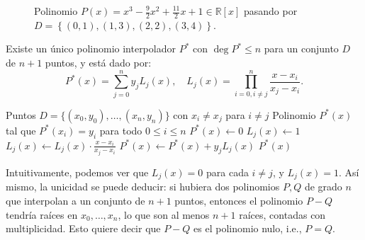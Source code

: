 \begin{figure}[h]
	\centering
	\caption{Polinomio $P(x) = x^3 - \frac{9}{2}x^2 + \frac{11}{2}x + 1 \in \mathbb{R}[x]$ pasando por $D = \left\{(0,1),(1,3),(2,2),(3,4)\right\}$.}
	\label{fig:interpolacion-polinomio}
\end{figure}


\begin{theorem}
	Existe un único polinomio interpolador $P^*$ con $\deg P^* \leq n$ para un conjunto $D$ de $n + 1$ puntos, y está dado por:
	$$P^*(x) = \sum_{j=0}^{n} y_j L_j(x), \quad L_j(x) = \prod_{i=0, i \neq j}^{n} \frac{x - x_i}{x_j - x_i}.$$
\end{theorem}

\begin{algorithm}[h]
	\caption{Interpolación de Lagrange}
	\label{alg:lagrange-interpolation}
	\begin{algorithmic}[1]
		\Require Puntos $D = \{(x_0,y_0), \ldots, (x_n,y_n)\}$ con $x_i \neq x_j$ para $i \neq j$
		\Ensure Polinomio $P^*(x)$ tal que $P^*(x_i)=y_i$ para todo $0 \leq i \leq n$
		\State $P^*(x) \gets 0$
			\State $L_j(x) \gets 1$
					\State $L_j(x) \gets L_j(x)\cdot \frac{x - x_i}{x_j - x_i}$
				\EndIf
			\EndFor
			\State $P^*(x) \gets P^*(x) + y_jL_j(x)$
		\EndFor
		\State \Return $P^*(x)$
	\end{algorithmic}
\end{algorithm}

Intuitivamente, podemos ver que $L_j(x) = 0$ para cada $i \neq j$, y $L_j(x) = 1$. Así mismo, la unicidad se puede deducir: si hubiera dos polinomios $P, Q$ de grado $n$ que interpolan a un conjunto de $n + 1$ puntos, entonces el polinomio $P - Q$ tendría raíces en $x_0, \ldots, x_n$, lo que son al menos $n + 1$ raíces, contadas con multiplicidad. Esto quiere decir que $P - Q$ es el polinomio nulo, i.e., $P = Q$.
